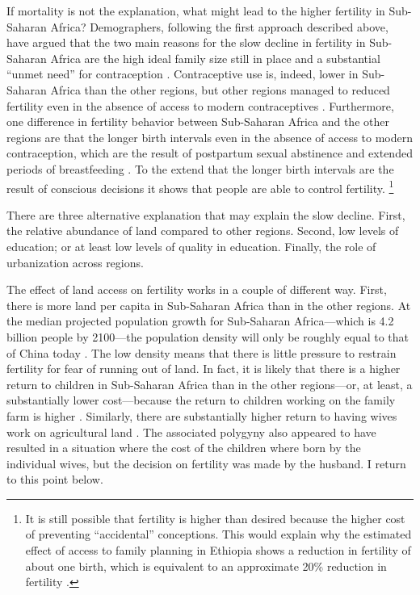 \documentclass[letterpaper,12pt]{article}
\begin{document}
If mortality is not the explanation, what might lead to the
higher fertility in Sub-Saharan Africa?
Demographers, following the first approach described above, 
have argued that the two main reasons for the slow decline 
in fertility in Sub-Saharan Africa are the high ideal family 
size still in place and a substantial ``unmet need'' for contraception  
\citep{Bongaarts2013a,Singh2017}.
Contraceptive use is, indeed, lower in Sub-Saharan Africa than
the other regions, but other regions managed to reduced fertility
even in the absence of access to modern contraceptives 
\citet{Schultz1985,Galloway1987,Bailey1998,bengtsson06}.
Furthermore, one difference in fertility behavior between 
Sub-Saharan Africa and the other regions are that the longer 
birth intervals even in the absence of access to modern 
contraception, which are the result of postpartum sexual 
abstinence and extended periods of breastfeeding \citep{Caldwell1992}.
To the extend that the longer birth intervals are the result
of conscious decisions it shows that people are able to
control fertility.%
\footnote{
It is still possible that fertility is higher than desired
because the higher cost of preventing ``accidental''
conceptions.
This would explain why the estimated effect of access to 
family planning in Ethiopia shows a reduction in fertility
of about one birth, which is equivalent to an approximate
20\% reduction in fertility \citet{Portner2014a}.
}


There are three alternative explanation that may explain the
slow decline.
First, the relative abundance of land compared to other regions.
Second, low levels of education; or at least low levels of quality
in education.
Finally, the role of urbanization across regions.  

The effect of land access on fertility works in a couple of 
different way.
First, there is more land per capita in Sub-Saharan Africa than
in the other regions.
At the median projected population growth for Sub-Saharan 
Africa---which is 4.2 billion people by 2100---the 
population density will only be roughly equal to
that of China today \citep[p 235]{Gerland2014}.
The low density means that there is little pressure to 
restrain fertility for fear of running out of land.
In fact, it is likely that there is a higher return to
children in Sub-Saharan Africa than in the other regions---or,
at least, a substantially lower cost---because the return to
children working on the family farm is higher \citep{Caldwell1992}.
Similarly, there are substantially higher return to having 
wives work on agricultural land \citep{jacoby95}.
The associated polygyny also appeared to have resulted
in a situation where the cost of the children where born
by the individual wives, but the decision on fertility
was made by the husband.
I return to this point below.
\end{document}
